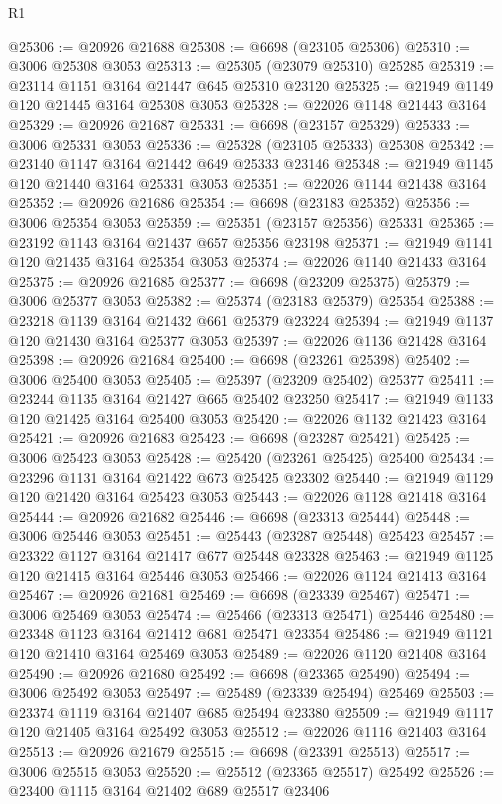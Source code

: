 \begin{lexlean}{R1}
\begin{coremodule}
@25306 := @20926 @21688
@25308 := @6698 (@23105 @25306)
@25310 := @3006 @25308 @3053
@25313 := @25305 (@23079 @25310) @25285
@25319 := @23114 @1151 @3164 @21447 @645 @25310 @23120
@25325 := @21949 @1149 @120 @21445 @3164 @25308 @3053
@25328 := @22026 @1148 @21443 @3164
@25329 := @20926 @21687
@25331 := @6698 (@23157 @25329)
@25333 := @3006 @25331 @3053
@25336 := @25328 (@23105 @25333) @25308
@25342 := @23140 @1147 @3164 @21442 @649 @25333 @23146
@25348 := @21949 @1145 @120 @21440 @3164 @25331 @3053
@25351 := @22026 @1144 @21438 @3164
@25352 := @20926 @21686
@25354 := @6698 (@23183 @25352)
@25356 := @3006 @25354 @3053
@25359 := @25351 (@23157 @25356) @25331
@25365 := @23192 @1143 @3164 @21437 @657 @25356 @23198
@25371 := @21949 @1141 @120 @21435 @3164 @25354 @3053
@25374 := @22026 @1140 @21433 @3164
@25375 := @20926 @21685
@25377 := @6698 (@23209 @25375)
@25379 := @3006 @25377 @3053
@25382 := @25374 (@23183 @25379) @25354
@25388 := @23218 @1139 @3164 @21432 @661 @25379 @23224
@25394 := @21949 @1137 @120 @21430 @3164 @25377 @3053
@25397 := @22026 @1136 @21428 @3164
@25398 := @20926 @21684
@25400 := @6698 (@23261 @25398)
@25402 := @3006 @25400 @3053
@25405 := @25397 (@23209 @25402) @25377
@25411 := @23244 @1135 @3164 @21427 @665 @25402 @23250
@25417 := @21949 @1133 @120 @21425 @3164 @25400 @3053
@25420 := @22026 @1132 @21423 @3164
@25421 := @20926 @21683
@25423 := @6698 (@23287 @25421)
@25425 := @3006 @25423 @3053
@25428 := @25420 (@23261 @25425) @25400
@25434 := @23296 @1131 @3164 @21422 @673 @25425 @23302
@25440 := @21949 @1129 @120 @21420 @3164 @25423 @3053
@25443 := @22026 @1128 @21418 @3164
@25444 := @20926 @21682
@25446 := @6698 (@23313 @25444)
@25448 := @3006 @25446 @3053
@25451 := @25443 (@23287 @25448) @25423
@25457 := @23322 @1127 @3164 @21417 @677 @25448 @23328
@25463 := @21949 @1125 @120 @21415 @3164 @25446 @3053
@25466 := @22026 @1124 @21413 @3164
@25467 := @20926 @21681
@25469 := @6698 (@23339 @25467)
@25471 := @3006 @25469 @3053
@25474 := @25466 (@23313 @25471) @25446
@25480 := @23348 @1123 @3164 @21412 @681 @25471 @23354
@25486 := @21949 @1121 @120 @21410 @3164 @25469 @3053
@25489 := @22026 @1120 @21408 @3164
@25490 := @20926 @21680
@25492 := @6698 (@23365 @25490)
@25494 := @3006 @25492 @3053
@25497 := @25489 (@23339 @25494) @25469
@25503 := @23374 @1119 @3164 @21407 @685 @25494 @23380
@25509 := @21949 @1117 @120 @21405 @3164 @25492 @3053
@25512 := @22026 @1116 @21403 @3164
@25513 := @20926 @21679
@25515 := @6698 (@23391 @25513)
@25517 := @3006 @25515 @3053
@25520 := @25512 (@23365 @25517) @25492
@25526 := @23400 @1115 @3164 @21402 @689 @25517 @23406

\end{coremodule}
\end{lexlean}
